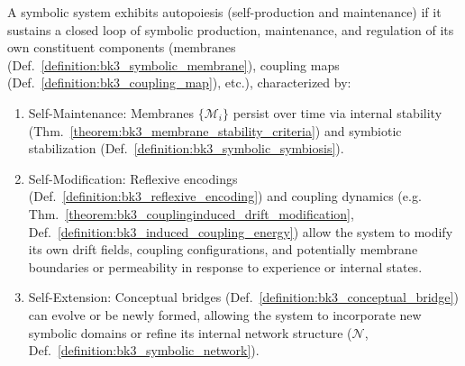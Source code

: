 \begin{definition} \label{definition:bk3_symbolic_autopoiesis}
A symbolic system exhibits autopoiesis (self-production and maintenance) if it sustains a closed loop of symbolic production, maintenance, and regulation of its own constituent components (membranes (Def.~\ref{definition:bk3_symbolic_membrane}), coupling maps (Def.~\ref{definition:bk3_coupling_map}), etc.), characterized by:
\begin{enumerate}
    \item Self-Maintenance: Membranes $\{\mathcal{M}_i\}$ persist over time via
    internal stability (Thm.~\ref{theorem:bk3_membrane_stability_criteria}) and
    symbiotic stabilization (Def.~\ref{definition:bk3_symbolic_symbiosis}).
    \item Self-Modification: Reflexive encodings (Def.~\ref{definition:bk3_reflexive_encoding}) and coupling dynamics (e.g. Thm.~\ref{theorem:bk3_couplinginduced_drift_modification}, Def.~\ref{definition:bk3_induced_coupling_energy}) allow the system to modify its own drift fields, coupling configurations, and potentially membrane boundaries or permeability in response to experience or internal states.
    \item Self-Extension: Conceptual bridges (Def.~\ref{definition:bk3_conceptual_bridge}) can evolve or be newly formed, allowing the system to incorporate new symbolic domains or refine its internal network structure ($\mathcal{N}$, Def.~\ref{definition:bk3_symbolic_network}).
\end{enumerate}
\end{definition}

